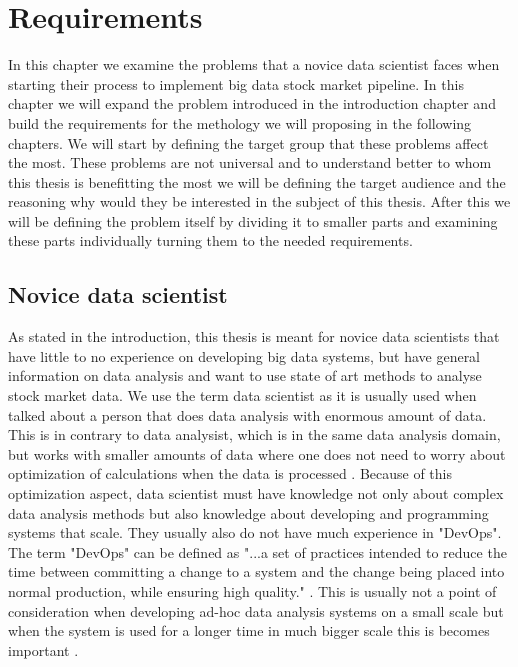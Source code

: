 \chapter{Requirements}
\label{chapter:problem}

In this chapter we examine the problems that a novice data scientist faces when starting their process to implement big data stock market pipeline.
In this chapter we will expand the problem introduced in the introduction chapter and build the requirements for the methology we will proposing in the following chapters.
We will start by defining the target group that these problems affect the most.
These problems are not universal and to understand better to whom this thesis is benefitting the most we will be defining the target audience and the reasoning why would they be interested in the subject of this thesis.
After this we will be defining the problem itself by dividing it to smaller parts and examining these parts individually turning them to the needed requirements.

\section{Novice data scientist}

As stated in the introduction, this thesis is meant for novice data scientists that have little to no experience on developing big data systems, but have general information on data analysis and want to use state of art methods to analyse stock market data.
We use the term data scientist as it is usually used when talked about a person that does data analysis with enormous amount of data.
This is in contrary to data analysist, which is in the same data analysis domain, but works with smaller amounts of data where one does not need to worry about optimization of calculations when the data is processed \cite{voulgaris}.
Because of this optimization aspect, data scientist must have knowledge not only about complex data analysis methods but also knowledge about developing and programming systems that scale.
They usually also do not have much experience in "DevOps".
The term "DevOps" can be defined as "...a set of practices intended to reduce the time between committing a change to a system and the change being placed into normal production, while ensuring high quality." \cite{devops}.
This is usually not a point of consideration when developing ad-hoc data analysis systems on a small scale but when the system is used for a longer time in much bigger scale this is becomes important \cite{devops}. 

